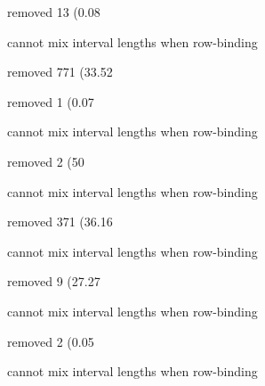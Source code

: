 \documentclass[
]{jss}
\begin{document}
\begin{CodeChunk}
\begin{CodeOutput}
removed 13 (0.08%
\end{CodeOutput}

\begin{CodeOutput}
cannot mix interval lengths when row-binding
\end{CodeOutput}

\begin{CodeOutput}
removed 771 (33.52%
\end{CodeOutput}

\begin{CodeOutput}
removed 1 (0.07%
\end{CodeOutput}

\begin{CodeOutput}
cannot mix interval lengths when row-binding
\end{CodeOutput}

\begin{CodeOutput}
removed 2 (50%
\end{CodeOutput}

\begin{CodeOutput}
cannot mix interval lengths when row-binding
\end{CodeOutput}

\begin{CodeOutput}
removed 371 (36.16%
\end{CodeOutput}

\begin{CodeOutput}
cannot mix interval lengths when row-binding
\end{CodeOutput}

\begin{CodeOutput}
removed 9 (27.27%
\end{CodeOutput}

\begin{CodeOutput}
cannot mix interval lengths when row-binding
\end{CodeOutput}

\begin{CodeOutput}
removed 2 (0.05%
\end{CodeOutput}

\begin{CodeOutput}
cannot mix interval lengths when row-binding
\end{CodeOutput}


\end{CodeChunk}
\end{document}
